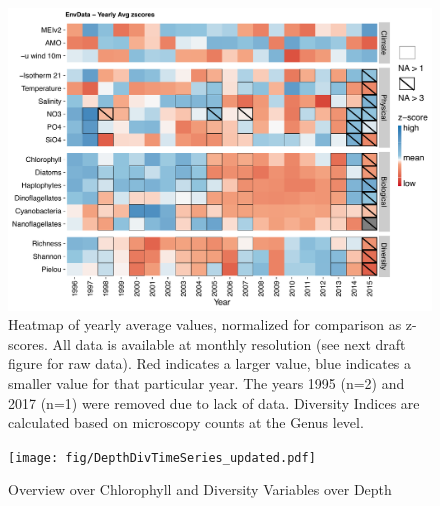 \documentclass[draft]{agujournal2019}
\begin{document}
\begin{figure}
\label{fig:zscore}
\noindent\includegraphics[width=\textwidth]{fig/PLOTZScores_updated.pdf}
\caption{Heatmap of yearly average values, normalized for comparison as z-scores. All data is available at monthly resolution (see next draft figure for raw data). Red indicates a larger value, blue indicates a smaller value for that particular year. The years 1995 (n=2) and 2017 (n=1) were removed due to lack of data. Diversity Indices are calculated based on microscopy counts at the Genus level.}
\end{figure}

\begin{figure}
\label{fig:divts}
\begin{center}
\noindent\texttt{[image: fig/DepthDivTimeSeries\_updated.pdf]}
\end{center}
\caption{Overview over Chlorophyll and Diversity Variables over Depth}
\end{figure}
\end{document}
